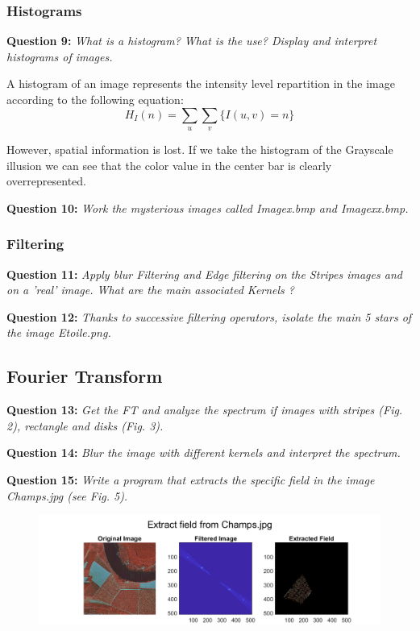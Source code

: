 \subsubsection{Histograms}
\textbf{Question 9:}
\textit{What is a histogram? What is the use? Display and interpret histograms of images.}

A histogram of an image represents the intensity level repartition in the image according to the following equation:
\[H_I(n) = \sum_{u} \sum_{v} \{ I(u, v) = n \}\]

However, spatial information is lost. 
If we take the histogram of the Grayscale illusion we can see that the color value in the center bar is clearly overrepresented.




\textbf{Question 10:}
\textit{Work the mysterious images called Imagex.bmp and Imagexx.bmp.}






\subsubsection{Filtering}
\textbf{Question 11:}
\textit{Apply blur Filtering and Edge ﬁltering on the Stripes images and on a ’real’ image. What are the main associated Kernels ?}



\textbf{Question 12:}
\textit{Thanks to successive ﬁltering operators, isolate the main 5 stars of the image Etoile.png.}


\subsection{Fourier Transform}
\textbf{Question 13:}
\textit{Get the FT and analyze the spectrum if images with stripes (Fig. 2), rectangle and disks (Fig. 3).}



\textbf{Question 14:}
\textit{Blur the image with diﬀerent kernels and interpret the spectrum.}



\textbf{Question 15:}
\textit{Write a program that extracts the speciﬁc ﬁeld in the image Champs.jpg (see Fig. 5).}
\begin{figure}[H]
    \centering
    \includegraphics[width=\linewidth]{Doc/Graphics/Part1/Part1_Question15.png}
    \label{fig:enter-label}
\end{figure}


